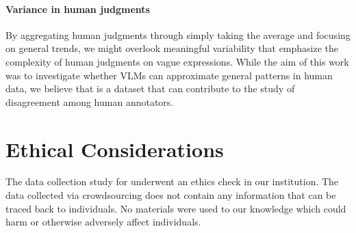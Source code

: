 \paragraph{Variance in human judgments}
By aggregating human judgments through simply taking the average and focusing on general trends, we might overlook meaningful variability that emphasize the complexity of human judgments on vague expressions. 
While the aim of this work was to investigate whether VLMs can approximate general patterns in human data, we believe that \dataset is a dataset that can contribute to the study of  disagreement among human annotators.


\section*{Ethical Considerations}
The data collection study for \dataset underwent an ethics check in our institution. The data collected via crowdsourcing does not contain any information that can be traced back to individuals. No materials were used to our knowledge which could harm or otherwise adversely affect individuals.